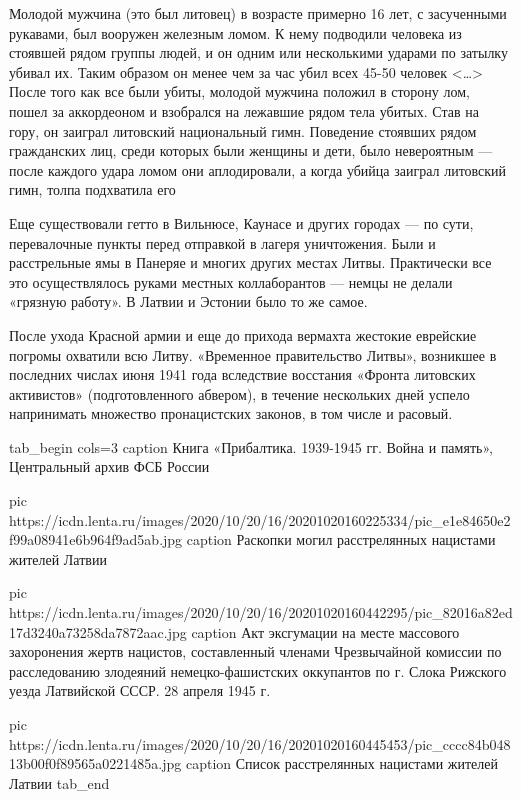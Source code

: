 \begin{fancyquotes}
Молодой мужчина (это был литовец) в возрасте примерно 16 лет, с засученными
рукавами, был вооружен железным ломом. К нему подводили человека из стоявшей
рядом группы людей, и он одним или несколькими ударами по затылку убивал их.
Таким образом он менее чем за час убил всех 45-50 человек <…> После того как
все были убиты, молодой мужчина положил в сторону лом, пошел за аккордеоном и
взобрался на лежавшие рядом тела убитых. Став на гору, он заиграл литовский
национальный гимн. Поведение стоявших рядом гражданских лиц, среди которых были
женщины и дети, было невероятным — после каждого удара ломом они аплодировали,
а когда убийца заиграл литовский гимн, толпа подхватила его
\end{fancyquotes}

Еще существовали гетто в Вильнюсе, Каунасе и других городах — по сути,
перевалочные пункты перед отправкой в лагеря уничтожения. Были и расстрельные
ямы в Панеряе и многих других местах Литвы. Практически все это осуществлялось
руками местных коллаборантов — немцы не делали «грязную работу». В Латвии и
Эстонии было то же самое.


После ухода Красной армии и еще до прихода вермахта жестокие еврейские погромы
охватили всю Литву. «Временное правительство Литвы», возникшее в последних
числах июня 1941 года вследствие восстания «Фронта литовских активистов»
(подготовленного абвером), в течение нескольких дней успело напринимать
множество пронацистских законов, в том числе и расовый.

\ifcmt
tab_begin cols=3
	caption Книга «Прибалтика. 1939-1945 гг. Война и память», Центральный архив ФСБ России

	pic https://icdn.lenta.ru/images/2020/10/20/16/20201020160225334/pic_e1e84650e2f99a08941e6b964f9ad5ab.jpg
	caption Раскопки могил расстрелянных нацистами жителей Латвии

	pic https://icdn.lenta.ru/images/2020/10/20/16/20201020160442295/pic_82016a82ed17d3240a73258da7872aac.jpg
	caption Акт эксгумации на месте массового захоронения жертв нацистов, составленный членами Чрезвычайной комиссии по расследованию злодеяний немецко-фашистских оккупантов по г. Слока Рижского уезда Латвийской СССР. 28 апреля 1945 г.

	pic https://icdn.lenta.ru/images/2020/10/20/16/20201020160445453/pic_cccc84b04813b00f0f89565a0221485a.jpg
	caption Список расстрелянных нацистами жителей Латвии
tab_end
\fi


